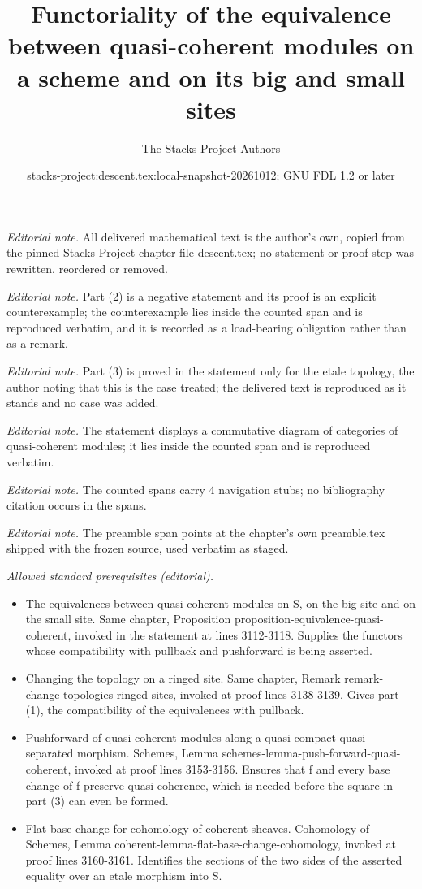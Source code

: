 \documentclass{stacks-project}
\title{Functoriality of the equivalence between quasi-coherent modules on a scheme and on its big and small sites}
\author{The Stacks Project Authors}
\date{stacks-project:descent.tex:local-snapshot-20261012; GNU FDL 1.2 or later}
\theoremstyle{plain}
\theoremstyle{definition}
\theoremstyle{remark}
\numberwithin{equation}{subsection}
\begin{document}
\maketitle
\noindent\textit{Editorial note.} All delivered mathematical text is the author's own, copied from the pinned Stacks Project chapter file descent.tex; no statement or proof step was rewritten, reordered or removed.\par\medskip
\noindent\textit{Editorial note.} Part (2) is a negative statement and its proof is an explicit counterexample; the counterexample lies inside the counted span and is reproduced verbatim, and it is recorded as a load-bearing obligation rather than as a remark.\par\medskip
\noindent\textit{Editorial note.} Part (3) is proved in the statement only for the etale topology, the author noting that this is the case treated; the delivered text is reproduced as it stands and no case was added.\par\medskip
\noindent\textit{Editorial note.} The statement displays a commutative diagram of categories of quasi-coherent modules; it lies inside the counted span and is reproduced verbatim.\par\medskip
\noindent\textit{Editorial note.} The counted spans carry 4 navigation stubs; no bibliography citation occurs in the spans.\par\medskip
\noindent\textit{Editorial note.} The preamble span points at the chapter's own preamble.tex shipped with the frozen source, used verbatim as staged.\par\medskip
\noindent\textit{Allowed standard prerequisites (editorial).}\begin{itemize}
\item The equivalences between quasi-coherent modules on S, on the big site and on the small site. Same chapter, Proposition proposition-equivalence-quasi-coherent, invoked in the statement at lines 3112-3118. Supplies the functors whose compatibility with pullback and pushforward is being asserted.
\item Changing the topology on a ringed site. Same chapter, Remark remark-change-topologies-ringed-sites, invoked at proof lines 3138-3139. Gives part (1), the compatibility of the equivalences with pullback.
\item Pushforward of quasi-coherent modules along a quasi-compact quasi-separated morphism. Schemes, Lemma schemes-lemma-push-forward-quasi-coherent, invoked at proof lines 3153-3156. Ensures that f and every base change of f preserve quasi-coherence, which is needed before the square in part (3) can even be formed.
\item Flat base change for cohomology of coherent sheaves. Cohomology of Schemes, Lemma coherent-lemma-flat-base-change-cohomology, invoked at proof lines 3160-3161. Identifies the sections of the two sides of the asserted equality over an etale morphism into S.
\end{itemize}\medskip
\end{document}
